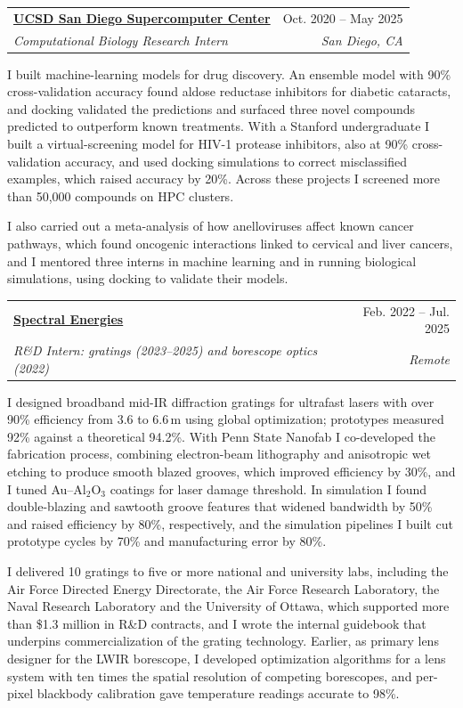 \documentclass[letterpaper,10pt]{article}
\makeatletter
\newif\ifafterhead
\newcommand{\cvEntry}[4]{%
  \par\ifafterhead\vspace{5.2pt}\else\vspace{5pt}\fi\global\afterheadfalse\hspace*{0.15in}%
  \begin{tabular*}{0.97\textwidth}[t]{l@{\extracolsep{\fill}}r}
    \textbf{#1} & #2 \\
    \textit{\small #3} & \textit{\small #4} \\
  \end{tabular*}\par\nopagebreak\vspace{-0.2pt}\nopagebreak}
\makeatother
\begin{document}
\cvEntry{\href{https://www.sdsc.edu/}{UCSD San Diego Supercomputer Center}}{Oct. 2020 -- May 2025}
  {Computational Biology Research Intern}{San Diego, CA}
\begin{cvBody}
I built machine-learning models for drug discovery. An ensemble model with 90\% cross-validation accuracy found aldose reductase inhibitors for diabetic cataracts, and docking validated the predictions and surfaced three novel compounds predicted to outperform known treatments. With a Stanford undergraduate I built a virtual-screening model for HIV-1 protease inhibitors, also at 90\% cross-validation accuracy, and used docking simulations to correct misclassified examples, which raised accuracy by 20\%. Across these projects I screened more than 50,000 compounds on HPC clusters.

I also carried out a meta-analysis of how anelloviruses affect known cancer pathways, which found oncogenic interactions linked to cervical and liver cancers, and I mentored three interns in machine learning and in running biological simulations, using docking to validate their models.
\end{cvBody}

\cvEntry{\href{https://spectralenergies.com/}{Spectral Energies}}{Feb. 2022 -- Jul. 2025}
  {R\&D Intern: gratings (2023--2025) and borescope optics (2022)}{Remote}
\begin{cvBody}
I designed broadband mid-IR diffraction gratings for ultrafast lasers with over 90\% efficiency from 3.6 to 6.6\,\textmu m using global optimization; prototypes measured 92\% against a theoretical 94.2\%. With Penn State Nanofab I co-developed the fabrication process, combining electron-beam lithography and anisotropic wet etching to produce smooth blazed grooves, which improved efficiency by 30\%, and I tuned Au--Al$_2$O$_3$ coatings for laser damage threshold. In simulation I found double-blazing and sawtooth groove features that widened bandwidth by 50\% and raised efficiency by 80\%, respectively, and the simulation pipelines I built cut prototype cycles by 70\% and manufacturing error by 80\%.

I delivered 10 gratings to five or more national and university labs, including the Air Force Directed Energy Directorate, the Air Force Research Laboratory, the Naval Research Laboratory and the University of Ottawa, which supported more than \$1.3 million in R\&D contracts, and I wrote the internal guidebook that underpins commercialization of the grating technology. Earlier, as primary lens designer for the LWIR borescope, I developed optimization algorithms for a lens system with ten times the spatial resolution of competing borescopes, and per-pixel blackbody calibration gave temperature readings accurate to 98\%.
\end{cvBody}
\end{document}
